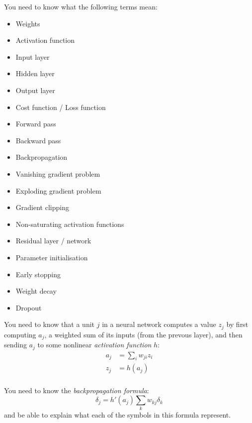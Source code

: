 \documentclass{article}
\newcommand{\yntk}{You need to know}
\begin{document}
\yntk{} what the following terms mean:
\begin{itemize}
\item Weights
\item Activation function
\item Input layer
\item Hidden layer
\item Output layer
\item Cost function / Loss function
\item Forward pass
\item Backward pass
\item Backpropagation
\item Vanishing gradient problem
\item Exploding gradient problem
\item Gradient clipping
\item Non-saturating activation functions
\item Residual layer / network
\item Parameter initialisation
\item Early stopping
\item Weight decay
\item Dropout
\end{itemize}

\yntk{} that a unit $j$ in a neural network computes a value $z_j$ by
first computing $a_j$, a weighted sum of its inputs (from the prevous
layer), and then sending $a_j$ to some nonlinear \emph{activation
  function} $h$:
\begin{align}
  \label{eq:preact}
  a_{j} & = \sum_{i}w_{ji}z_{i} \\
  \label{eq:act}
  z_{j} & = h(a_{j}) \\
\end{align}

\yntk{} the \emph{backpropagation formula}:
\begin{equation}
  \label{eq:backprop}
  \delta_{j} = h'(a_{j})\sum_{k}w_{kj}\delta_{k}
\end{equation}
and be able to explain what each of the symbols in this formula represent.
\end{document}
